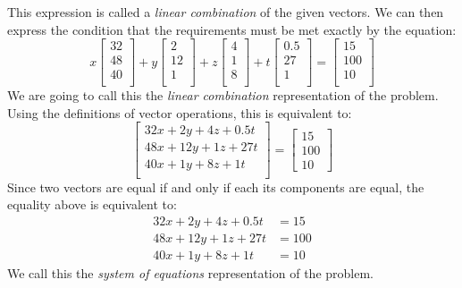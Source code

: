\documentclass[12pt]{article}
\begin{document}
This expression is called a \emph{linear combination} of the given vectors. We can then express the condition that the requirements must be met exactly by the equation:
\[
x\left[\begin{matrix} 32  \\ 48 \\ 40 \\ \end{matrix}\right]+
y\left[\begin{matrix}  2  \\ 12 \\  1 \\ \end{matrix}\right]+
z\left[\begin{matrix}  4  \\  1 \\  8 \\ \end{matrix}\right]+
t\left[\begin{matrix} 0.5 \\ 27 \\  1 \\ \end{matrix}\right]=
\left[\begin{matrix} 15  \\ 100 \\ 10 \\ \end{matrix}\right]
\]
We are going to call this the \emph{linear combination} representation of the problem. 
Using the definitions of vector operations, this is equivalent to:
\[
\left[
\begin{matrix}
32x+2y+4z+0.5t\\
48x+12y+1z+27t\\
40x+1y+8z+1t\\
\end{matrix}
\right]=
\left[\begin{matrix}
15 \\ 100 \\ 10
\end{matrix}\right]
\]
Since two vectors are equal if and only if each its components are equal, the equality above is equivalent to:
\begin{align*}
32x+2y+4z+0.5t &= 15\\
48x+12y+1z+27t &= 100\\
40x+1y+8z+1t   &= 10
\end{align*}
We call this the \emph{system of equations} representation of the problem.
\end{document}
